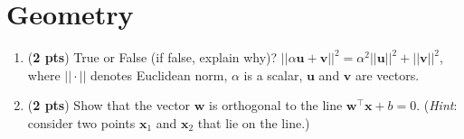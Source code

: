 \documentclass[11pt, letterpaper]{article}
\begin{document}
\newpage
\section{Geometry}
\begin{enumerate}[label=(\alph*)]
    \item (\textbf{2 pts}) True or False (if false, explain why)?  $||\alpha\mathbf{u} + \mathbf{v}||^2 = \alpha^2||\mathbf{u}||^2 + ||\mathbf{v}||^2$, where $||\cdot||$ denotes Euclidean norm, $\alpha$ is a scalar, $\mathbf{u}$ and $\mathbf{v}$ are vectors.
    \item (\textbf{2 pts}) Show that the vector $\mathbf{w}$ is orthogonal to the line $\mathbf{w}^\top\mathbf{x} + b = 0$. (\textit{Hint}: consider two points $\mathbf{x}_1$ and $\mathbf{x}_2$ that lie on the line.)
\end{enumerate}

\newpage
\end{document}
